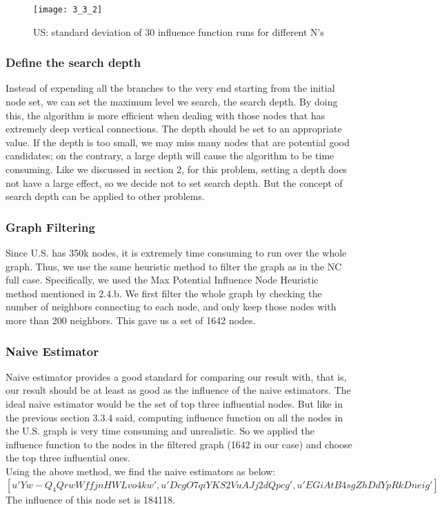 \documentclass{article}
\begin{document}
\begin{figure}[h]
\begin{center}
\texttt{[image: 3\_3\_2]} %
\caption{US: standard deviation of 30 influence function runs for different N's}
\end{center}
\end{figure}

\FloatBarrier
\subsubsection{Define the search depth}%

Instead of expending all the branches to the very end starting from the initial node set, we can set the maximum level we search, the search depth. By doing this, the algorithm is more efficient when dealing with those nodes that has extremely deep vertical connections. The depth should be set to an appropriate value. If the depth is too small, we may miss many nodes that are potential good candidates; on the contrary, a large depth will cause the algorithm to be time consuming. Like we discussed in section 2, for this problem, setting a depth does not have a large effect, so we decide not to set search depth. But the concept of search depth can be applied to other problems.


\FloatBarrier
\subsubsection{Graph Filtering}%

Since U.S. has 350k nodes, it is extremely time consuming to run over the whole graph. Thus, we use the same heuristic method to filter the graph as in the NC full case. Specifically, we used the Max Potential Influence Node Heuristic method mentioned in 2.4.b. We first filter the whole graph by checking the number of neighbors connecting to each node, and only keep those nodes with more than 200 neighbors. This gave us a set of 1642 nodes. 

\FloatBarrier
\subsubsection{Naive Estimator}%

Naive estimator provides a good standard for comparing our result with, that is, our result should be at least as good as the influence of the naive estimators. The ideal naive estimator would be the set of top three influential nodes.  But like in the previous section 3.3.4 said, computing influence function on all the nodes in the U.S. graph is very time consuming and unrealistic. So we applied the influence function to the nodes in the filtered graph (1642 in our case) and choose the top three influential ones. \\
Using the above method, we find the naive estimators as below: \\
$[u'Yw-Q_4QrwWffjnHWLvo4kw', u'DcgO7qiYKS2VuAJj2dQpcg', u'EGiAtB4sgZhDdYpRkDneig']$ \\
The influence of this node set is 184118.
\end{document}
